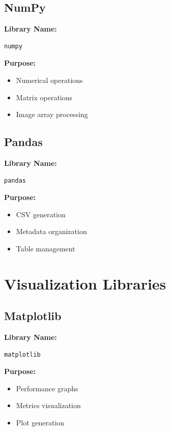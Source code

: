 \documentclass[12pt]{article}
\begin{document}
\subsection{NumPy}

\textbf{Library Name:}
\begin{verbatim}
numpy
\end{verbatim}

\textbf{Purpose:}
\begin{itemize}
    \item Numerical operations
    \item Matrix operations
    \item Image array processing
\end{itemize}

\subsection{Pandas}

\textbf{Library Name:}
\begin{verbatim}
pandas
\end{verbatim}

\textbf{Purpose:}
\begin{itemize}
    \item CSV generation
    \item Metadata organization
    \item Table management
\end{itemize}

\section{Visualization Libraries}

\subsection{Matplotlib}

\textbf{Library Name:}
\begin{verbatim}
matplotlib
\end{verbatim}

\textbf{Purpose:}
\begin{itemize}
    \item Performance graphs
    \item Metrics visualization
    \item Plot generation
\end{itemize}
\end{document}

